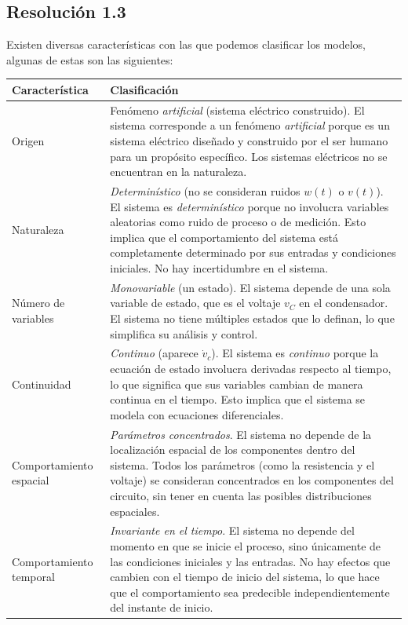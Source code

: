 \documentclass[
  11pt,
  letterpaper,
   addpoints,
   answers
  ]{exam}
\begin{document}
\begin{questions}
\begin{solution}
\subsection*{Resolución 1.3}
Existen diversas características con las que podemos clasificar los modelos, algunas de estas son las siguientes:
\begin{center}
\begin{tabular}{|p{3cm}|p{11cm}|}
\hline
\textbf{Característica} & \textbf{Clasificación} \\
\hline
Origen & Fenómeno \emph{artificial} (sistema eléctrico construido). El sistema corresponde a un fenómeno \emph{artificial} porque es un sistema eléctrico diseñado y construido por el ser humano para un propósito específico. Los sistemas eléctricos no se encuentran en la naturaleza. \\
\hline
Naturaleza & \emph{Determinístico} (no se consideran ruidos \(w(t)\) o \(v(t)\)). El sistema es \emph{determinístico} porque no involucra variables aleatorias como ruido de proceso o de medición. Esto implica que el comportamiento del sistema está completamente determinado por sus entradas y condiciones iniciales. No hay incertidumbre en el sistema. \\
\hline
Número de variables & \emph{Monovariable} (un estado). El sistema depende de una sola variable de estado, que es el voltaje \(v_C\) en el condensador. El sistema no tiene múltiples estados que lo definan, lo que simplifica su análisis y control. \\
\hline
Continuidad & \emph{Continuo} (aparece \(\dot v_c\)). El sistema es \emph{continuo} porque la ecuación de estado involucra derivadas respecto al tiempo, lo que significa que sus variables cambian de manera continua en el tiempo. Esto implica que el sistema se modela con ecuaciones diferenciales. \\
\hline
Comportamiento espacial & \emph{Parámetros concentrados}. El sistema no depende de la localización espacial de los componentes dentro del sistema. Todos los parámetros (como la resistencia y el voltaje) se consideran concentrados en los componentes del circuito, sin tener en cuenta las posibles distribuciones espaciales. \\
\hline
Comportamiento temporal & \emph{Invariante en el tiempo}. El sistema no depende del momento en que se inicie el proceso, sino únicamente de las condiciones iniciales y las entradas. No hay efectos que cambien con el tiempo de inicio del sistema, lo que hace que el comportamiento sea predecible independientemente del instante de inicio. \\

\end{tabular}
\end{center}
\end{solution}
\end{questions}
\end{document}
